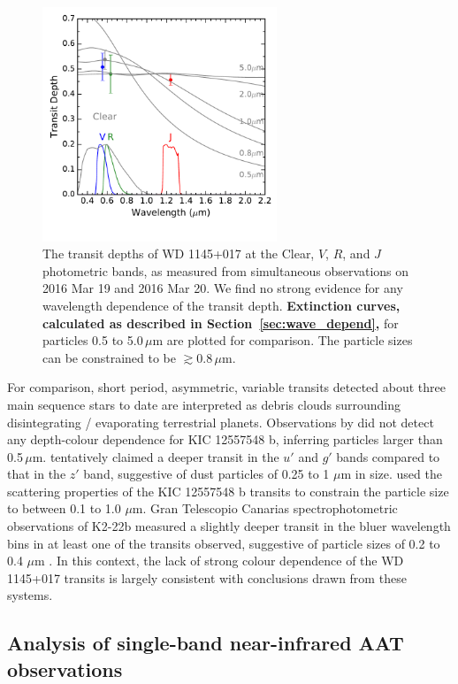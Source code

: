 \documentclass[useAMS,usenatbib]{mn2e}
\begin{document}
\begin{figure}
    \centering
    \includegraphics[width=7cm]{plots/band_depth.pdf}
    \caption{The transit depths of WD 1145+017 at the Clear, $V$, $R$, and $J$ photometric bands, as measured from simultaneous observations on 2016 Mar 19 and 2016 Mar 20. We find no strong evidence for any wavelength dependence of the transit depth. \textbf{Extinction curves, calculated as described in Section~\ref{sec:wave_depend},} for particles 0.5 to 5.0\,$\mu$m are plotted for comparison. The particle sizes can be constrained to be $\gtrsim 0.8\,\mu$m.}
    \label{fig:band_depth}
\end{figure}

For comparison, short period, asymmetric, variable transits detected about three main sequence stars to date \citep{2012ApJ...752....1R,2014ApJ...784...40R,2015ApJ...812..112S} are interpreted as debris clouds surrounding disintegrating / evaporating terrestrial planets. Observations by \citet{2014ApJ...786..100C} did not detect any depth-colour dependence for KIC 12557548 b, inferring particles larger than 0.5\,$\mu$m. \citet{2015ApJ...800L..21B} tentatively claimed a deeper transit in the $u'$ and $g'$ bands compared to that in the $z'$ band, suggestive of dust particles of 0.25 to 1 $\mu$m in size. \citet{2013A&A...557A..72B} used the scattering properties of the KIC 12557548 b transits to constrain the particle size to between 0.1 to 1.0 $\mu$m. Gran Telescopio Canarias spectrophotometric observations of K2-22b measured a slightly deeper transit in the bluer wavelength bins in at least one of the transits observed, suggestive of particle sizes of 0.2 to 0.4 $\mu$m \citep{2015ApJ...812..112S}.  In this context, the lack of strong colour dependence of the WD 1145+017 transits is largely consistent with conclusions drawn from these systems.

\subsection{Analysis of single-band near-infrared AAT observations}
\label{sec:single_band_AAT}
\end{document}
